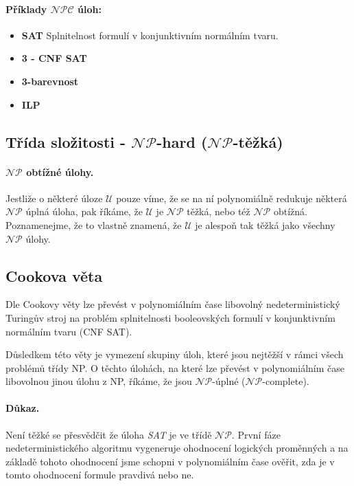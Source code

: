 \paragraph{Příklady $\mathcal{NPC}$ úloh:}
\begin{itemize}[itemsep=0pt]
    \item \textbf{\color{darkBrown}SAT} Splnitelnost formulí v konjunktivním normálním tvaru.
    
    \item \textbf{\color{darkBrown}3 - CNF SAT}
    
    \item \textbf{\color{darkBrown}3-barevnost}
    
    \item \textbf{\color{darkBrown}ILP}
\end{itemize}

\subsection*{Třída složitosti - $\mathcal{NP}$-hard ($\mathcal{NP}$-těžká)}
\label{heading:nphard}

\paragraph{$\mathcal{NP}$ obtížné úlohy.} Jestliže o některé úloze $\mathcal{U}$ pouze víme, že se na ní polynomiálně redukuje některá $\mathcal{NP}$ úplná úloha, pak říkáme, že $\mathcal{U}$ je $\mathcal{NP}$ těžká, nebo též $\mathcal{NP}$ obtížná. Poznamenejme, že to vlastně znamená, že $\mathcal{U}$ je alespoň tak těžká jako všechny $\mathcal{NP}$ úlohy.

\subsection*{Cookova věta}
Dle Cookovy věty lze převést v polynomiálním čase libovolný nedeterministický Turingův stroj na problém splnitelnosti booleovských formulí v konjunktivním normálním tvaru (CNF SAT).

Důsledkem této věty je vymezení skupiny úloh, které jsou nejtěžší v rámci všech problémů třídy NP. O těchto úlohách, na které lze převést v polynomiálním čase libovolnou jinou úlohu z NP, říkáme, že jsou $\mathcal{NP}$-úplné ($\mathcal{NP}$-complete).

\paragraph{Důkaz.} Není těžké se přesvědčit že úloha \textit{SAT} je ve třídě $\mathcal{NP}$. První fáze nedeterministického algoritmu vygeneruje ohodnocení logických proměnných a na základě tohoto ohodnocení jsme schopni v polynomiálním čase ověřit, zda je v tomto ohodnocení formule pravdivá nebo ne.

